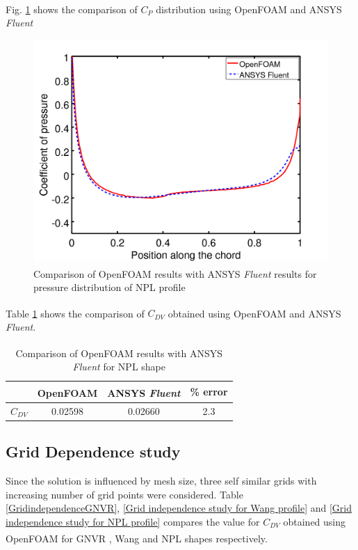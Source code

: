 Fig. \ref{NPL fig} shows the comparison of $ C_{P} $ distribution using OpenFOAM\textsuperscript{\textregistered} and ANSYS\textsuperscript{\textregistered} \textit{Fluent}
\begin{figure}[H]
	\centering
	\includegraphics[width=300 pt]{rnd/NPL_cp.png}
	\caption{Comparison of OpenFOAM\textsuperscript{\textregistered} results with ANSYS\textsuperscript{\textregistered} \textit{Fluent} results for pressure distribution of NPL profile \cite{cheeseman2012}}
	\label{NPL fig} %
\end{figure} 


Table \ref{NPL table} shows the comparison of $ C_{DV} $ obtained using OpenFOAM\textsuperscript{\textregistered} and ANSYS\textsuperscript{\textregistered} \textit{Fluent}.

\begin{table} [H]
	\centering
	\caption{\label{NPL table} Comparison of OpenFOAM\textsuperscript{\textregistered} results with ANSYS\textsuperscript{\textregistered} \textit{Fluent} for NPL shape}
	\begin{tabular}{cccc}
		\hline \hline
		& OpenFOAM\textsuperscript{\textregistered} & ANSYS\textsuperscript{\textregistered} \textit{Fluent} & \% error \\ \hline \hline
		
		$ C_{DV} $ & 0.02598 & 0.02660 & 2.3    \\   \hline
	\end{tabular}
\end{table}

\pagebreak

\subsection{Grid Dependence study}
Since the solution is influenced by mesh size, three self similar grids with increasing number of grid points were considered. Table \ref{GridindependenceGNVR}, \ref{Grid independence study for Wang profile} and \ref{Grid independence study for NPL profile} compares the value for $C_{DV}$ obtained using OpenFOAM\textsuperscript{\textregistered} for GNVR \cite{Ram2010}, Wang \cite{Wang2009} and NPL\cite{cheeseman2012} shapes respectively.

